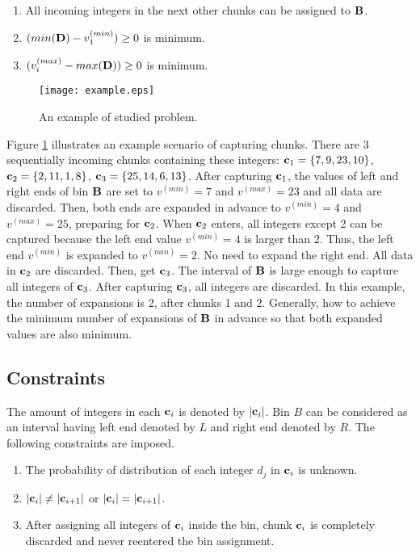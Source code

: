 \documentclass[lettersize,journal]{IEEEtran}
\begin{document}
\begin{enumerate}
\item All incoming integers in the next other chunks can be assigned to ${\bf B}$.
\item $(min({\bf D}) - v^{(min)}_{1}) \geq 0$ is minimum.
\item $(v^{(max)}_{i} - max({\bf D})) \geq 0$ is minimum.
\end{enumerate}

\begin{figure}[!t]
\centering
\texttt{[image: example.eps]} 
\caption{An example of studied problem.} 
\label{example}
\end{figure}

\IEEEpubidadjcol
Figure \ref{example} illustrates an example scenario of capturing chunks. There are 3 sequentially incoming
chunks containing these integers: ${\bf c}_{1} = \{7, 9, 23, 10\}$, ${\bf c}_{2} = \{2, 11, 1, 8\}$,
${\bf c}_{3} = \{25, 14, 6, 13\}$. After capturing ${\bf c}_{1}$, the values of left and right ends of
bin ${\bf B}$ are set to $v^{(min)} = 7$ and $v^{(max)} = 23$ and all data are discarded. Then, both ends 
are expanded in advance to $v^{(min)}= 4$ and $v^{(max)} = 25$, preparing for ${\bf c}_{2}$. 
When ${\bf c}_{2}$ enters, all integers except 2 can be captured because the left end value 
$v^{(min)}= 4$ is larger than 2. Thus, the left end $v^{(min)}$ is expanded to $v^{(min)} = 2$. 
No need to expand the right end. All data in ${\bf c}_{2}$ are discarded. Then, get ${\bf c}_{3}$.
The interval of ${\bf B}$ is large enough to capture all integers of ${\bf c}_{3}$. After capturing 
${\bf c}_{3}$, all integers are discarded. In this example, the number of expansions is 2, after chunks 1 
and 2. Generally, how to achieve the minimum number of expansions of ${\bf B}$ in advance so that both
expanded values are also minimum.

\subsection{Constraints}
The amount of integers in each ${\bf c}_{i}$ is denoted by $|{\bf c}_{i}|$. Bin $B$ can be considered 
as an interval having left end denoted by $L$ and right end denoted by $R$. The following constraints are imposed.
\begin{enumerate}
\item The probability of distribution of each integer $d_{j}$ in ${\bf c}_{i}$ is unknown.
\item $|{\bf c}_{i}| \neq |{\bf c}_{i+1}|$ or $|{\bf c}_{i}| = |{\bf c}_{i+1}|$.
\item After assigning all integers of ${\bf c}_{i}$ inside the bin, chunk ${\bf c}_{i}$ is completely 
discarded and never reentered the bin assignment.
\end{enumerate}
\end{document}
